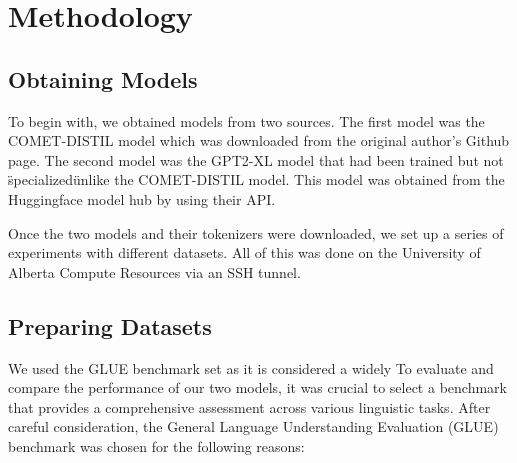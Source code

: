 \documentclass[\main/thesis.tex]{subfiles}
\begin{document}
\chapter{Methodology}
\label{chap:methodology}

\section{Obtaining Models}\label{sec:ObtainingModels}
To begin with, we obtained models from two sources. The first model was the COMET-DISTIL model
which was downloaded from the original author's Github page\cite{west_symbolic_2021}. The second model 
was the GPT2-XL model that had been trained but not \"specialized\" unlike the COMET-DISTIL model. This 
model was obtained from the Huggingface model hub by using their API.

Once the two models and their tokenizers were downloaded, we set up a series of experiments with 
different datasets. All of this was done on the University of Alberta Compute Resources via an SSH tunnel. 

\section{Preparing Datasets}\label{sec:PrepareDataset}
We used the GLUE\cite{wang_glue_2019} benchmark set as it is considered a widely 
To evaluate and compare the performance of our two models, it was crucial to select a benchmark 
that provides a comprehensive assessment across various linguistic tasks. 
After careful consideration, the General Language Understanding Evaluation (GLUE) benchmark was chosen for the following reasons:
\end{document}
